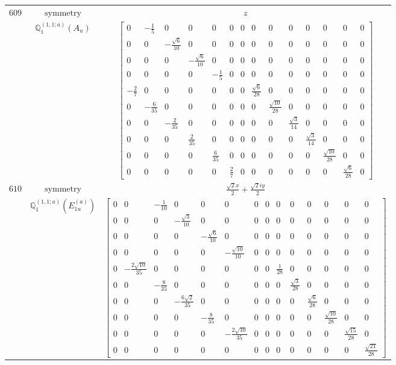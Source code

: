 \documentclass[fleqn,8pt,landscape]{jsarticle}
\begin{document}
\begin{longtable}{ccc}
$ 609 $ & $ \text{symmetry} $ & $ z $ \\
$  $ & $ \mathbb{Q}_{1}^{(1,1;a)}(A_{u}) $ & $ \begin{bmatrix} 0 & - \frac{1}{5} & 0 & 0 & 0 & 0 & 0 & 0 & 0 & 0 & 0 & 0 & 0 & 0 \\ 0 & 0 & - \frac{\sqrt{6}}{10} & 0 & 0 & 0 & 0 & 0 & 0 & 0 & 0 & 0 & 0 & 0 \\ 0 & 0 & 0 & - \frac{\sqrt{6}}{10} & 0 & 0 & 0 & 0 & 0 & 0 & 0 & 0 & 0 & 0 \\ 0 & 0 & 0 & 0 & - \frac{1}{5} & 0 & 0 & 0 & 0 & 0 & 0 & 0 & 0 & 0 \\ - \frac{2}{7} & 0 & 0 & 0 & 0 & 0 & 0 & \frac{\sqrt{6}}{28} & 0 & 0 & 0 & 0 & 0 & 0 \\ 0 & - \frac{6}{35} & 0 & 0 & 0 & 0 & 0 & 0 & \frac{\sqrt{10}}{28} & 0 & 0 & 0 & 0 & 0 \\ 0 & 0 & - \frac{2}{35} & 0 & 0 & 0 & 0 & 0 & 0 & \frac{\sqrt{3}}{14} & 0 & 0 & 0 & 0 \\ 0 & 0 & 0 & \frac{2}{35} & 0 & 0 & 0 & 0 & 0 & 0 & \frac{\sqrt{3}}{14} & 0 & 0 & 0 \\ 0 & 0 & 0 & 0 & \frac{6}{35} & 0 & 0 & 0 & 0 & 0 & 0 & \frac{\sqrt{10}}{28} & 0 & 0 \\ 0 & 0 & 0 & 0 & 0 & \frac{2}{7} & 0 & 0 & 0 & 0 & 0 & 0 & \frac{\sqrt{6}}{28} & 0 \end{bmatrix} $ \\ \hline
$ 610 $ & $ \text{symmetry} $ & $ \frac{\sqrt{2} x}{2} + \frac{\sqrt{2} i y}{2} $ \\
$  $ & $ \mathbb{Q}_{1}^{(1,1;a)}(E_{1u}^{(a)}) $ & $ \begin{bmatrix} 0 & 0 & - \frac{1}{10} & 0 & 0 & 0 & 0 & 0 & 0 & 0 & 0 & 0 & 0 & 0 \\ 0 & 0 & 0 & - \frac{\sqrt{3}}{10} & 0 & 0 & 0 & 0 & 0 & 0 & 0 & 0 & 0 & 0 \\ 0 & 0 & 0 & 0 & - \frac{\sqrt{6}}{10} & 0 & 0 & 0 & 0 & 0 & 0 & 0 & 0 & 0 \\ 0 & 0 & 0 & 0 & 0 & - \frac{\sqrt{10}}{10} & 0 & 0 & 0 & 0 & 0 & 0 & 0 & 0 \\ 0 & - \frac{2 \sqrt{10}}{35} & 0 & 0 & 0 & 0 & 0 & 0 & \frac{1}{28} & 0 & 0 & 0 & 0 & 0 \\ 0 & 0 & - \frac{8}{35} & 0 & 0 & 0 & 0 & 0 & 0 & \frac{\sqrt{3}}{28} & 0 & 0 & 0 & 0 \\ 0 & 0 & 0 & - \frac{6 \sqrt{2}}{35} & 0 & 0 & 0 & 0 & 0 & 0 & \frac{\sqrt{6}}{28} & 0 & 0 & 0 \\ 0 & 0 & 0 & 0 & - \frac{8}{35} & 0 & 0 & 0 & 0 & 0 & 0 & \frac{\sqrt{10}}{28} & 0 & 0 \\ 0 & 0 & 0 & 0 & 0 & - \frac{2 \sqrt{10}}{35} & 0 & 0 & 0 & 0 & 0 & 0 & \frac{\sqrt{15}}{28} & 0 \\ 0 & 0 & 0 & 0 & 0 & 0 & 0 & 0 & 0 & 0 & 0 & 0 & 0 & \frac{\sqrt{21}}{28} \end{bmatrix} $ \\ \hline

\end{longtable}
\end{document}
